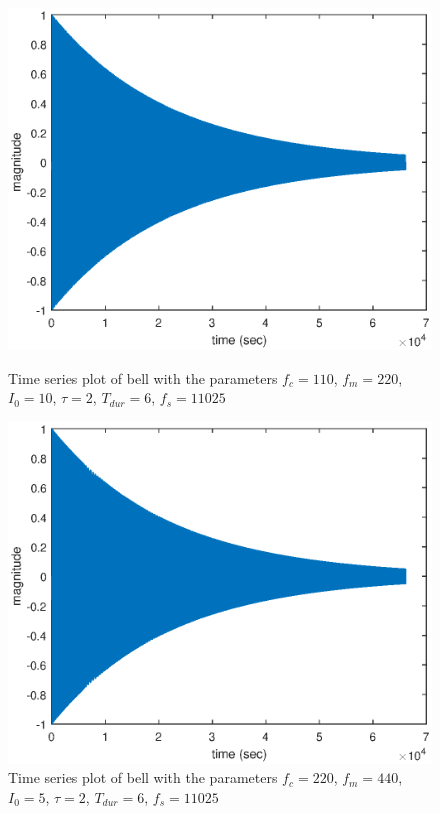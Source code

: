 \documentclass{article}
\begin{document}
\begin{figure}[H]
	\centering
	\begin{minipage}{0.3\linewidth}
		\includegraphics[scale=0.3]{time1}
		\caption{Time series plot of bell with the parameters $f_c = 110$, $f_m = 220$, $I_0 = 10$, $\tau = 2$, $T_{dur} = 6$, $f_s = 11025$}
	\end{minipage}
	\hspace{4cm}
	\begin{minipage}{0.3\linewidth}
		\includegraphics[scale=0.3]{time2}
		\caption{Time series plot of bell with the parameters $f_c = 220$, $f_m = 440$, $I_0 = 5$, $\tau = 2$, $T_{dur} = 6$, $f_s = 11025$}
	\end{minipage}
\end{figure}
\end{document}
